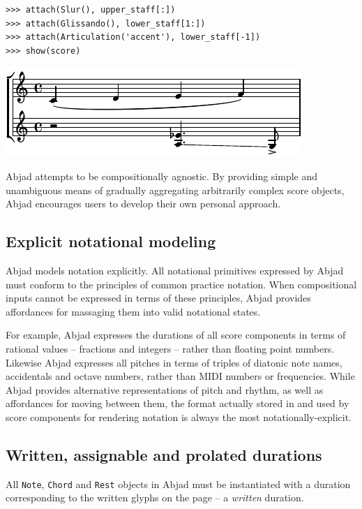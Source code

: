 \begin{lstlisting}
>>> attach(Slur(), upper_staff[:])
>>> attach(Glissando(), lower_staff[1:])
>>> attach(Articulation('accent'), lower_staff[-1])
>>> show(score)
\end{lstlisting}

\includegraphics[scale=1.0]{images/section_2_notational_isomorphism-2.pdf}


Abjad attempts to be compositionally agnostic. By providing simple and
unambiguous means of gradually aggregating arbitrarily complex score objects,
Abjad encourages users to develop their own personal approach.

\subsection{Explicit notational modeling}

Abjad models notation explicitly. All notational primitives expressed by Abjad
must conform to the principles of common practice notation. When compositional
inputs cannot be expressed in terms of these principles, Abjad provides
affordances for massaging them into valid notational states.

For example, Abjad expresses the durations of all score components in terms of
rational values -- fractions and integers -- rather than floating point
numbers. Likewise Abjad expresses all pitches in terms of triples of diatonic
note names, accidentals and octave numbers, rather than MIDI numbers or
frequencies. While Abjad provides alternative representations of pitch and
rhythm, as well as affordances for moving between them, the format actually
stored in and used by score components for rendering notation is always the
most notationally-explicit.

\subsection{Written, assignable and prolated durations}

All \texttt{Note}, \texttt{Chord} and \texttt{Rest} objects in Abjad must be
instantiated with a duration corresponding to the written glyphs on the page --
a \emph{written} duration.

